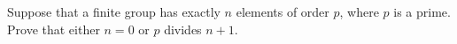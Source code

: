 Suppose that a finite group has exactly $n$ elements of order $p$,
where $p$ is a prime. Prove that either $n=0$ or $p$ divides $n+1$.
